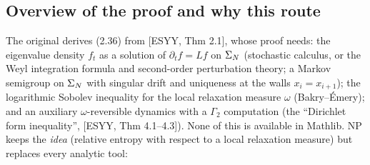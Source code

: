 \subsection{Overview of the proof and why this route}\label{ss:overview}

The original derives (2.36) from [ESYY, Thm 2.1], whose proof needs: the eigenvalue density $f_t$ as a solution of $\partial_tf=Lf$ on $\Sigma_N$ (stochastic calculus, or the Weyl integration formula and second-order perturbation theory; a Markov semigroup on $\Sigma_N$ with singular drift and uniqueness at the walls $x_i=x_{i+1}$);
the logarithmic Sobolev inequality for the local relaxation measure $\omega$ (Bakry--\'Emery); and an auxiliary $\omega$-reversible dynamics with a $\Gamma_2$ computation (the ``Dirichlet form inequality'', [ESYY, Thm 4.1--4.3]).
None of this is available in Mathlib. NP keeps the \emph{idea} (relative entropy with respect to a local relaxation measure) but replaces every analytic tool:

